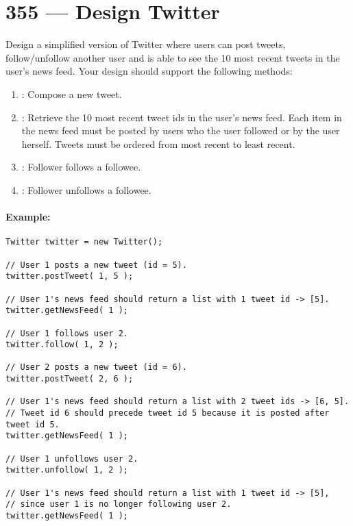 \section{355 --- Design Twitter}
Design a simplified version of Twitter where users can post tweets, follow/unfollow another user and is able to see the 10 most recent tweets in the user's news feed. Your design should support the following methods:

\begin{enumerate}
\item {}: Compose a new tweet.
\item {}: Retrieve the 10 most recent tweet ids in the user's news feed. Each item in the news feed must be posted by users who the user followed or by the user herself. Tweets must be ordered from most recent to least recent.
\item {}: Follower follows a followee.
\item {}: Follower unfollows a followee.
\end{enumerate}


\paragraph{Example:}

\begin{lstlisting}[style=customc]
Twitter twitter = new Twitter();

// User 1 posts a new tweet (id = 5).
twitter.postTweet( 1, 5 );

// User 1's news feed should return a list with 1 tweet id -> [5].
twitter.getNewsFeed( 1 );

// User 1 follows user 2.
twitter.follow( 1, 2 );

// User 2 posts a new tweet (id = 6).
twitter.postTweet( 2, 6 );

// User 1's news feed should return a list with 2 tweet ids -> [6, 5].
// Tweet id 6 should precede tweet id 5 because it is posted after tweet id 5.
twitter.getNewsFeed( 1 );

// User 1 unfollows user 2.
twitter.unfollow( 1, 2 );

// User 1's news feed should return a list with 1 tweet id -> [5],
// since user 1 is no longer following user 2.
twitter.getNewsFeed( 1 );
\end{lstlisting}

